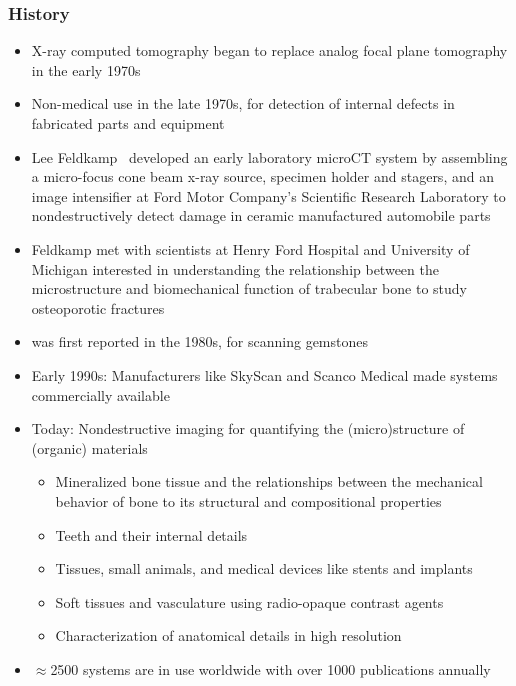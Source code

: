 \begin{frame}[allowframebreaks]
  \frametitle{\uct{} History}
  \begin{itemize}
    \item X-ray computed tomography began to replace analog focal plane tomography in the early 1970s~\cite{Lin2019}
    \item Non-medical use in the late 1970s, for detection of internal defects in fabricated parts and equipment
    \item Lee Feldkamp~\cite{Feldkamp1984} developed an early laboratory microCT system by assembling a micro-focus cone beam x-ray source, specimen holder and stagers, and an image intensifier at Ford Motor Company’s Scientific Research Laboratory to nondestructively detect damage in ceramic manufactured automobile parts
    \item Feldkamp met with scientists at Henry Ford Hospital and University of Michigan interested in understanding the relationship between the microstructure and biomechanical function of trabecular bone to study osteoporotic fractures~\cite{Feldkamp1983}
      \pagebreak
    \item \uct{} was first reported in the 1980s, for scanning gemstones
    \item Early 1990s: Manufacturers like SkyScan and Scanco Medical made \uct{} systems commercially available
    \item Today: Nondestructive imaging for quantifying the (micro)structure of (organic) materials
      \begin{itemize}
        \item Mineralized bone tissue and the relationships between the mechanical behavior of bone to its structural and compositional properties
        \item Teeth and their internal details
        \item Tissues, small animals, and medical devices like stents and implants
        \item Soft tissues and vasculature using radio-opaque contrast agents
        \item Characterization of anatomical details in high resolution
      \end{itemize}
    \item \(\approx\)2500 \uct{} systems are in use worldwide with over 1000 publications annually
  \end{itemize}
\end{frame}

